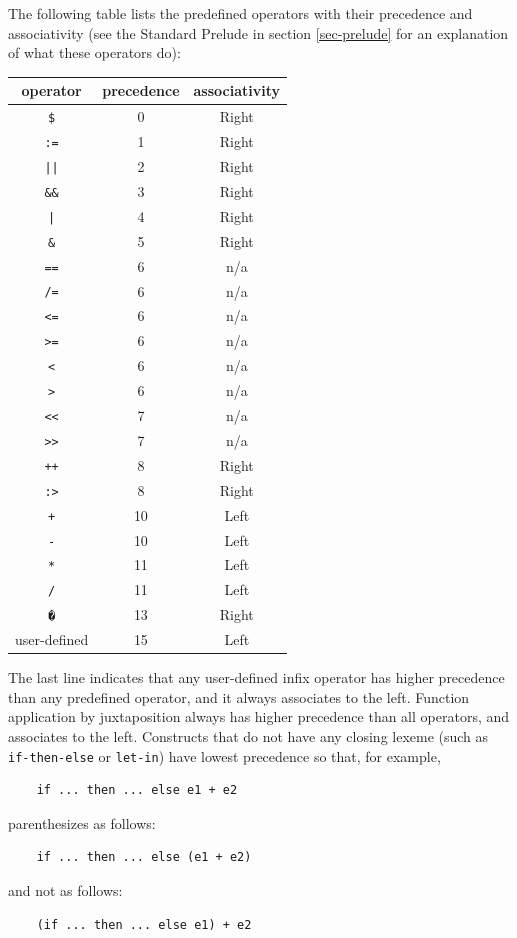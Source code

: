 \documentclass[twoside,letterpaper]{article}
\newcommand{\te}[1]{\texttt{#1}}
\newcommand{\term}[1]{{\tt{#1}}}
\begin{document}
The following table lists the predefined operators with their
precedence and associativity (see the Standard Prelude in section
{\ref{sec-prelude}} for an explanation of what these operators do):
\begin{center}
  \begin{tabular}[t]{|c|c|c|}
    \hline
    operator     & precedence & associativity \\
    \hline
    \term{\$}    & 0  & Right \\
    \verb":="    & 1  & Right \\
    \verb"||"    & 2  & Right \\
    \verb"&&"    & 3  & Right \\
    \verb"|"     & 4  & Right \\
    \verb"&"     & 5  & Right \\
    \verb"=="    & 6  & n/a   \\
    \verb"/="    & 6  & n/a   \\
    \verb"<="    & 6  & n/a   \\
    \verb">="    & 6  & n/a   \\
    \verb"<"     & 6  & n/a   \\
    \verb">"     & 6  & n/a   \\
    \verb"<<"    & 7  & n/a   \\
    \verb">>"    & 7  & n/a   \\
    \verb"++"    & 8  & Right \\
    \verb":>"    & 8  & Right \\
    \verb"+"     & 10  & Left  \\
    \verb"-"     & 10  & Left  \\
    \verb"*"     & 11  & Left  \\
    \verb"/"     & 11  & Left  \\
    \verb"�"     & 13  & Right \\
    user-defined & 15  & Left \\
    \hline
  \end{tabular}
\end{center}
The last line indicates that any user-defined infix operator has
higher precedence than any predefined operator, and it always
associates to the left.  Function application by juxtaposition always
has higher precedence than all operators, and associates to the left.
Constructs that do not have any closing lexeme (such as
{\te{if-then-else}} or {\te{let-in}}) have lowest precedence so that,
for example,
\begin{verbatim}
    if ... then ... else e1 + e2
\end{verbatim}
parenthesizes as follows:
\begin{verbatim}
    if ... then ... else (e1 + e2)
\end{verbatim}
and not as follows:
\begin{verbatim}
    (if ... then ... else e1) + e2
\end{verbatim}
\end{document}

